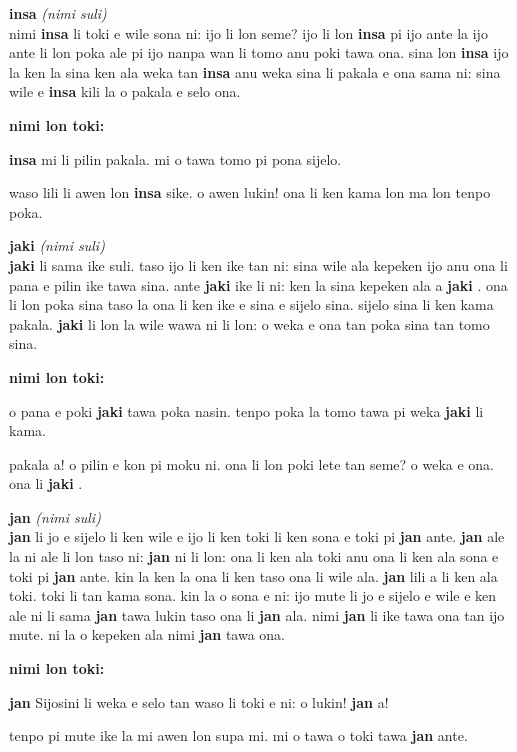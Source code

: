 \documentclass[a4paper,11pt]{book}
\newenvironment{definition}[2]{ %
  \begin{minipage}{\dimexpr\textwidth}
  \begin{description}
  \item
    {\huge \textbf{#1}}
    {\Large \textit{(#2)}} \\
}{
  \end{description}
  \end{minipage}
}
\newenvironment{example}{ %
  \item
  \textbf{nimi lon toki:}

  \hfill
  \begin{minipage}{\dimexpr\textwidth-1cm}
  \begin{itshape}
}
{
  \end{itshape}
  \end{minipage}
}
\newcommand{\inex}[1]{%
  \textbf{#1}%
}
\begin{document}

\begin{definition}{insa}{nimi suli}
  nimi \inex{insa} li toki e wile sona ni: ijo li lon seme? ijo li lon \inex{insa} pi ijo ante la ijo ante li lon poka ale pi ijo nanpa wan li tomo anu poki tawa ona. sina lon \inex{insa} ijo la ken la sina ken ala weka tan \inex{insa} anu weka sina li pakala e ona sama ni: sina wile e \inex{insa} kili la o pakala e selo ona.
  \begin{example}
    \inex{insa} mi li pilin pakala. mi o tawa tomo pi pona sijelo.
    
    waso lili li awen lon \inex{insa} sike. o awen lukin! ona li ken kama lon ma lon tenpo poka.
  \end{example}
\end{definition}

\begin{definition}{jaki}{nimi suli}
  \inex{jaki} li sama ike suli. taso ijo li ken ike tan ni: sina wile ala kepeken ijo anu ona li pana e pilin ike tawa sina. ante \inex{jaki} ike li ni: ken la sina kepeken ala a \inex{jaki}. ona li lon poka sina taso la ona li ken ike e sina e sijelo sina. sijelo sina li ken kama pakala. \inex{jaki} li lon la wile wawa ni li lon: o weka e ona tan poka sina tan tomo sina.
  \begin{example}
    o pana e poki \inex{jaki} tawa poka nasin. tenpo poka la tomo tawa pi weka \inex{jaki} li kama.

    pakala a! o pilin e kon pi moku ni. ona li lon poki lete tan seme? o weka e ona. ona li \inex{jaki}.
  \end{example}
\end{definition}

\begin{definition}{jan}{nimi suli}
  \inex{jan} li jo e sijelo li ken wile e ijo li ken toki li ken sona e toki pi \inex{jan} ante. \inex{jan} ale la ni ale li lon taso ni: \inex{jan} ni li lon: ona li ken ala toki anu ona li ken ala sona e toki pi \inex{jan} ante. kin la ken la ona li ken taso ona li wile ala. \inex{jan} lili a li ken ala toki. toki li tan kama sona. kin la o sona e ni: ijo mute li jo e sijelo e wile e ken ale ni li sama \inex{jan} tawa lukin taso ona li \inex{jan} ala. nimi \inex{jan} li ike tawa ona tan ijo mute. ni la o kepeken ala nimi \inex{jan} tawa ona.
  \begin{example}
    \inex{jan} Sijosini li weka e selo tan waso li toki e ni: o lukin! \inex{jan} a!
    
    tenpo pi mute ike la mi awen lon supa mi. mi o tawa o toki tawa \inex{jan} ante.
  \end{example}
\end{definition}
\end{document}
